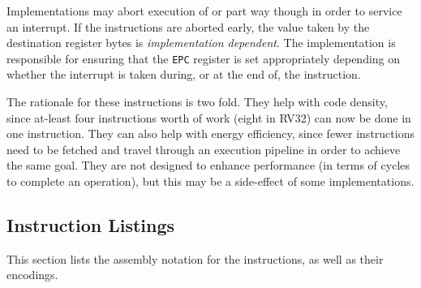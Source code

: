 Implementations may abort execution of  or  part way
though in order to service an interrupt. If the instructions are aborted
early, the value taken by the destination register bytes is {\em
implementation dependent}. The implementation is responsible for ensuring
that the {\tt EPC} register is set appropriately depending on whether the
interrupt is taken during, or at the end of, the instruction.

The rationale for these instructions is two fold. They help with code density,
since at-least four instructions worth of work (eight in RV32) can now be done
in one instruction. They can also help with energy efficiency, since fewer
instructions need to be fetched and travel through an execution pipeline in
order to achieve the same goal. They are not designed to enhance performance
(in terms of cycles to complete an operation), but this may be a side-effect
of some implementations.

\newpage
\subsection{Instruction Listings}

This section lists the assembly notation for the instructions, as well as
their encodings.

